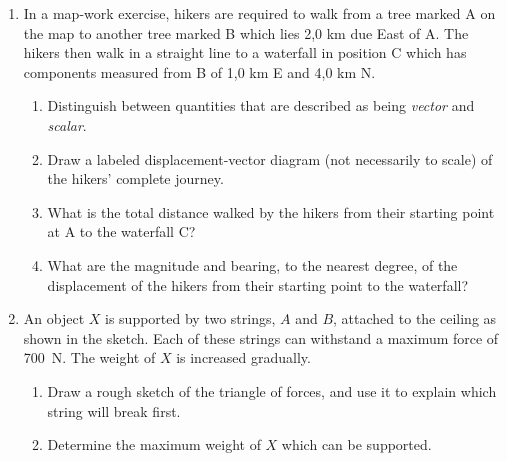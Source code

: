 \begin{enumerate}[noitemsep, label=\textbf{\arabic*}. ]
    \addtocounter{footnote}{-0}
            \label{m38819*uid136}\item In a map-work exercise, hikers are required to walk from a tree marked A on the map to another tree marked B which lies 2,0 km due East of A. The hikers then walk in a straight line to a waterfall in position C which has components measured from B of 1,0 km E and 4,0 km N.
\label{m38819*id198765}\begin{enumerate}[noitemsep, label=\textbf{\alph*}. ] 
            \label{m38819*uid137}\item Distinguish between quantities that are described as being \textsl{vector} and \textsl{scalar}.
\label{m38819*uid138}\item Draw a labeled displacement-vector diagram (not necessarily to scale) of the hikers' complete journey.
\label{m38819*uid139}\item What is the total distance walked by the hikers from their starting point at A to the waterfall C?
\label{m38819*uid140}\item What are the magnitude and bearing, to the nearest degree, of the displacement of the hikers from their starting point to the waterfall?
\end{enumerate}
                \label{m38819*uid141}\item An object \begin{math}X\end{math} is supported by two strings, \begin{math}A\end{math} and \begin{math}B\end{math}, attached to the ceiling as shown in the sketch. Each of these strings can withstand a maximum force of 700~N. The weight of \begin{math}X\end{math} is increased gradually.
\label{m38819*id198883}\begin{enumerate}[noitemsep, label=\textbf{\alph*}. ] 
            \label{m38819*uid142}\item Draw a rough sketch of the triangle of forces, and use it to explain which string will break first.
\label{m38819*uid143}\item Determine the maximum weight of \begin{math}X\end{math} which can be supported.
\end{enumerate}
        
    \setcounter{subfigure}{0}



\end{enumerate}
